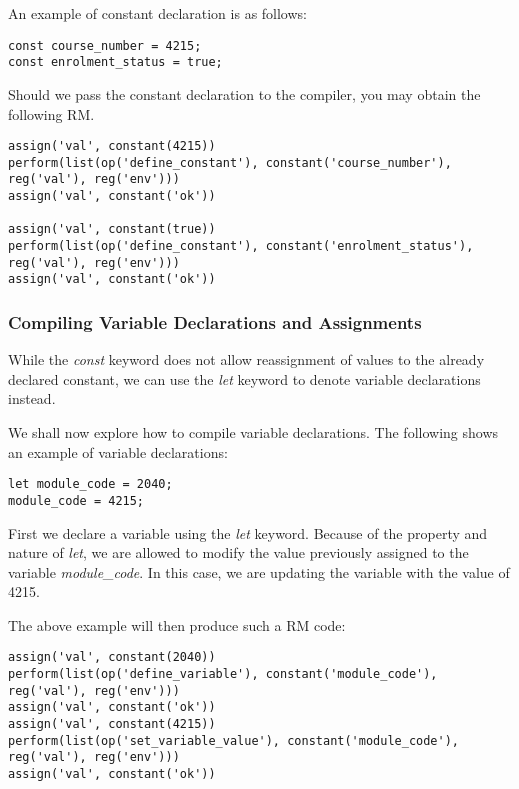 An example of constant declaration is as follows:
\begin{lstlisting}[caption=Examples of Constant Declarations]
const course_number = 4215;
const enrolment_status = true;
\end{lstlisting}

Should we pass the constant declaration to the compiler, you may obtain the following RM.
\begin{lstlisting}[caption=Constant Declaration RM]
assign('val', constant(4215))
perform(list(op('define_constant'), constant('course_number'), reg('val'), reg('env')))
assign('val', constant('ok'))

assign('val', constant(true))
perform(list(op('define_constant'), constant('enrolment_status'), reg('val'), reg('env')))
assign('val', constant('ok'))
\end{lstlisting}


\subsubsection{Compiling Variable Declarations and Assignments}
While the \textit{const} keyword does not allow reassignment of values to the already declared constant, we can use the \textit{let} keyword to denote variable declarations instead. 

We shall now explore how to compile variable declarations. The following shows an example of variable declarations:
\begin{lstlisting}[caption=Examples of Variable Declarations]
let module_code = 2040;
module_code = 4215;
\end{lstlisting}

First we declare a variable using the \textit{let} keyword. Because of the property and nature of \textit{let}, we are allowed to modify the value previously assigned to the variable \textit{module\_code}. In this case, we are updating the variable with the value of 4215.\newline

The above example will then produce such a RM code:
\begin{lstlisting}[caption=Variable Declaration RM]
assign('val', constant(2040))
perform(list(op('define_variable'), constant('module_code'), reg('val'), reg('env')))
assign('val', constant('ok'))
assign('val', constant(4215))
perform(list(op('set_variable_value'), constant('module_code'), reg('val'), reg('env')))
assign('val', constant('ok'))
\end{lstlisting}

